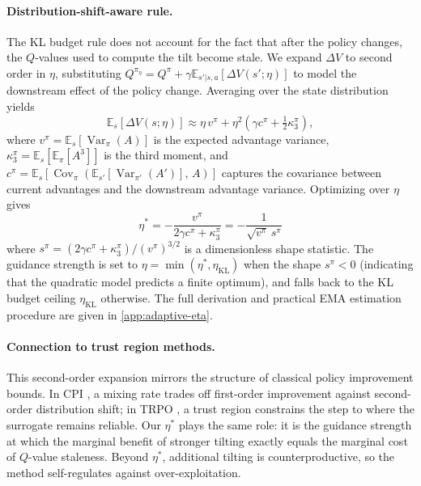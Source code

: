 \documentclass{article}
\theoremstyle{plain}
\theoremstyle{definition}
\theoremstyle{remark}
\newcommand{\E}{\mathbb{E}}
\DeclareMathOperator{\Var}{Var}
\DeclareMathOperator{\Cov}{Cov}
\begin{document}
\paragraph{Distribution-shift-aware rule.}
The KL budget rule does not account for the fact that after the policy changes, the $Q$-values used to compute the tilt become stale.
We expand $\Delta V$ to second order in $\eta$, substituting $Q^{\pi_\eta} = Q^\pi + \gamma \E_{s'|s,a}[\Delta V(s';\eta)]$ to model the downstream effect of the policy change.
Averaging over the state distribution yields
\begin{equation}
  \E_{s}[\Delta V(s;\eta)] \approx \eta\, v^\pi + \eta^2\!\left(\gamma c^\pi + \tfrac{1}{2}\kappa_3^\pi\right),
  \label{eq:delta-v-expansion}
\end{equation}
where $v^\pi = \E_s[\Var_\pi(A)]$ is the expected advantage variance, $\kappa_3^\pi = \E_s[\E_\pi[A^3]]$ is the third moment, and $c^\pi = \E_s[\Cov_\pi(\E_{s'}[\Var_{\pi'}(A')],\, A)]$ captures the covariance between current advantages and the downstream advantage variance.
Optimizing over $\eta$ gives
\begin{equation}
  \boxed{\;\eta^* = -\frac{v^\pi}{2\gamma c^\pi + \kappa_3^\pi} = -\frac{1}{\sqrt{v^\pi}\, s^\pi}\;}
  \label{eq:eta-star}
\end{equation}
where $s^\pi = (2\gamma c^\pi + \kappa_3^\pi) / (v^\pi)^{3/2}$ is a dimensionless shape statistic.
The guidance strength is set to $\eta = \min(\eta^*, \eta_{\text{KL}})$ when the shape $s^\pi < 0$ (indicating that the quadratic model predicts a finite optimum), and falls back to the KL budget ceiling $\eta_{\text{KL}}$ otherwise.
The full derivation and practical EMA estimation procedure are given in \cref{app:adaptive-eta}.

\paragraph{Connection to trust region methods.}
This second-order expansion mirrors the structure of classical policy improvement bounds.
In CPI \citep{kakade2002approximately}, a mixing rate trades off first-order improvement against second-order distribution shift; in TRPO \citep{schulman2015trust}, a trust region constrains the step to where the surrogate remains reliable.
Our $\eta^*$ plays the same role: it is the guidance strength at which the marginal benefit of stronger tilting exactly equals the marginal cost of $Q$-value staleness.
Beyond $\eta^*$, additional tilting is counterproductive, so the method self-regulates against over-exploitation.
\end{document}
